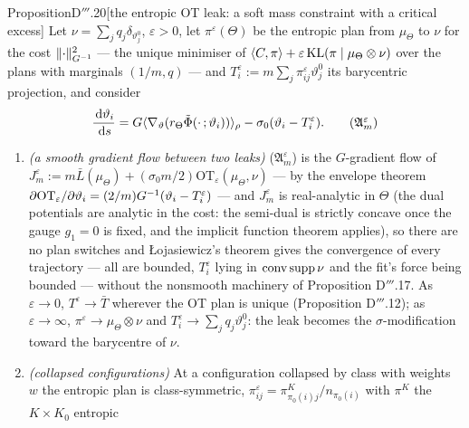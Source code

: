\begin{thm}{Proposition}{D$'''$.20}[the entropic OT leak: a soft mass constraint with a critical excess]
Let $\nu = \sum_jq_j\delta_{\vartheta^0_j}$, $\varepsilon > 0$, let $\pi^\varepsilon(\Theta)$ be the entropic plan
from $\mu_\Theta$ to $\nu$ for the cost $\lVert \cdot\rVert^2_{G^{-1}}$ --- the unique minimiser of
$\langle C,\pi\rangle + \varepsilon\operatorname{KL}(\pi\mid\mu_\Theta\otimes\nu)$ over the plans with marginals $(1/m,q)$ --- and
$T^\varepsilon_i := m\sum_j\pi^\varepsilon_{ij}\vartheta^0_j$ its barycentric projection, and consider
\begin{equation}
  \frac{\dd\vartheta_i}{\dd s} = G\langle\nabla_\vartheta(r_\Theta\tilde\Phi(\cdot\,;\vartheta_i))\rangle_\rho
  - \sigma_0(\vartheta_i - T^\varepsilon_i).
  \tag{$\mathfrak{A}_m^\varepsilon$}
\end{equation}
\begin{enumerate}[label=\textup{(\roman*)}]
  \item \emph{(a smooth gradient flow between two leaks)} \textup{($\mathfrak{A}_m^\varepsilon$)} is the
    $G$-gradient flow of
    $J^\varepsilon_m := m\bar L(\mu_\Theta) + (\sigma_0m/2)\mathrm{OT}_\varepsilon(\mu_\Theta,\nu)$ --- by the
    envelope theorem $\partial\mathrm{OT}_\varepsilon/\partial\vartheta_i = (2/m)G^{-1}(\vartheta_i - T^\varepsilon_i)$
    --- and $J^\varepsilon_m$ is real-analytic in $\Theta$ (the dual potentials are analytic in the cost: the
    semi-dual is strictly concave once the gauge $g_1 = 0$ is fixed, and the implicit function theorem applies), so
    there are no plan switches and {\L}ojasiewicz's theorem gives the convergence of every trajectory --- all are
    bounded, $T^\varepsilon_i$ lying in $\operatorname{conv}\operatorname{supp}\nu$ and the fit's force being bounded --- without
    the nonsmooth machinery of Proposition D$'''$.17. As $\varepsilon\to0$, $T^\varepsilon\to\bar T$ wherever the OT
    plan is unique (Proposition D$'''$.12); as $\varepsilon\to\infty$, $\pi^\varepsilon\to\mu_\Theta\otimes\nu$ and
    $T^\varepsilon_i\to\sum_jq_j\vartheta^0_j$: the leak becomes the $\sigma$-modification toward the barycentre of
    $\nu$.
  \item \emph{(collapsed configurations)} At a configuration collapsed by class with weights $w$ the entropic plan is
    class-symmetric, $\pi^\varepsilon_{ij} = \pi^K_{\pi_0(i)j}/n_{\pi_0(i)}$ with $\pi^K$ the $K\times K_0$ entropic

\end{enumerate}
\end{thm}
